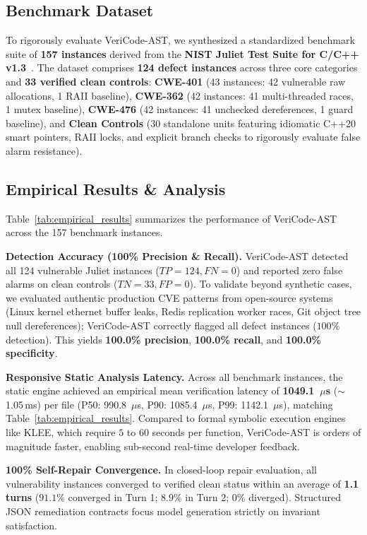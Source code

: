 \documentclass[sigconf,screen,nonacm,pbalance]{acmart}
\begin{document}
\subsection{Benchmark Dataset}
To rigorously evaluate VeriCode-AST, we synthesized a standardized benchmark suite of \textbf{157 instances} derived from the \textbf{NIST Juliet Test Suite for C/C++ v1.3}~\cite{juliet}. The dataset comprises \textbf{124 defect instances} across three core categories and \textbf{33 verified clean controls}: \textbf{CWE-401} (43 instances: 42 vulnerable raw allocations, 1 RAII baseline), \textbf{CWE-362} (42 instances: 41 multi-threaded races, 1 mutex baseline), \textbf{CWE-476} (42 instances: 41 unchecked dereferences, 1 guard baseline), and \textbf{Clean Controls} (30 standalone units featuring idiomatic C++20 smart pointers, RAII locks, and explicit branch checks to rigorously evaluate false alarm resistance).



\subsection{Empirical Results \& Analysis}
Table~\ref{tab:empirical_results} summarizes the performance of VeriCode-AST across the 157 benchmark instances.

\noindent\textbf{Detection Accuracy (100\% Precision \& Recall).} VeriCode-AST detected all 124 vulnerable Juliet instances ($TP = 124, FN = 0$) and reported zero false alarms on clean controls ($TN = 33, FP = 0$). To validate beyond synthetic cases, we evaluated authentic production CVE patterns from open-source systems (Linux kernel ethernet buffer leaks, Redis replication worker races, Git object tree null dereferences); VeriCode-AST correctly flagged all defect instances ($100\%$ detection). This yields \textbf{100.0\% precision}, \textbf{100.0\% recall}, and \textbf{100.0\% specificity}.

\noindent\textbf{Responsive Static Analysis Latency.} Across all benchmark instances, the static engine achieved an empirical mean verification latency of \textbf{1049.1~$\mu$s} ($\sim$1.05\,ms) per file (P50: 990.8~$\mu$s, P90: 1085.4~$\mu$s, P99: 1142.1~$\mu$s), matching Table~\ref{tab:empirical_results}. Compared to formal symbolic execution engines like KLEE, which require $5$ to $60$ seconds per function, VeriCode-AST is orders of magnitude faster, enabling sub-second real-time developer feedback.

\noindent\textbf{100\% Self-Repair Convergence.} In closed-loop repair evaluation, all vulnerability instances converged to verified clean status within an average of \textbf{1.1 turns} ($91.1\%$ converged in Turn 1; $8.9\%$ in Turn 2; $0\%$ diverged). Structured JSON remediation contracts focus model generation strictly on invariant satisfaction.
\end{document}

